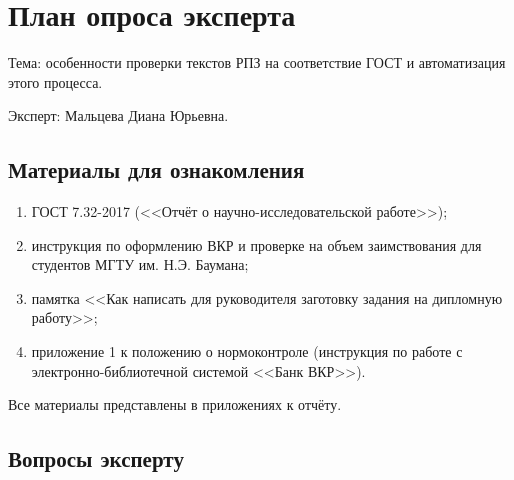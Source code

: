 \chapter{План опроса эксперта}

Тема: особенности проверки текстов РПЗ на соответствие ГОСТ и автоматизация этого процесса.

Эксперт: Мальцева Диана Юрьевна.

\section{Материалы для ознакомления}
\begin{enumerate}[label*=\arabic*)]
	\item ГОСТ 7.32-2017 (<<Отчёт о научно-исследовательской работе>>);
	\item инструкция по оформлению ВКР и проверке на объем заимствования для студентов МГТУ им. Н.Э. Баумана; 
	\item памятка <<Как написать для руководителя заготовку задания на дипломную работу>>; 
	\item приложение 1 к положению о нормоконтроле (инструкция по работе с электронно-библиотечной системой <<Банк ВКР>>). 
\end{enumerate}
Все материалы представлены в приложениях к отчёту.

\section{Вопросы эксперту}

